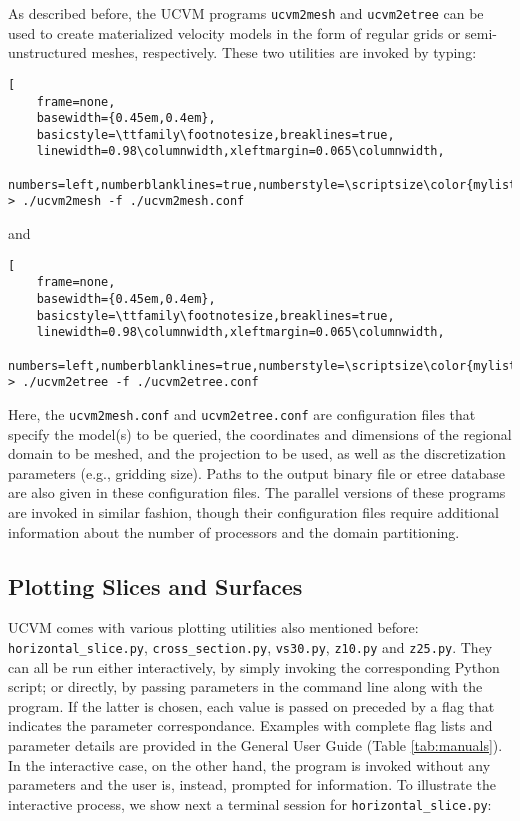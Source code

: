 As described before, the UCVM programs \texttt{ucvm2mesh} and \texttt{ucvm2etree} can be used to create materialized velocity models in the form of regular grids or semi-unstructured meshes, respectively. These two utilities are invoked by typing:

\begin{lstlisting}[
	frame=none,
	basewidth={0.45em,0.4em},
	basicstyle=\ttfamily\footnotesize,breaklines=true,
	linewidth=0.98\columnwidth,xleftmargin=0.065\columnwidth,
	numbers=left,numberblanklines=true,numberstyle=\scriptsize\color{mylistingnclr}]
> ./ucvm2mesh -f ./ucvm2mesh.conf
\end{lstlisting}

\noindent
and

\begin{lstlisting}[
	frame=none,
	basewidth={0.45em,0.4em},
	basicstyle=\ttfamily\footnotesize,breaklines=true,
	linewidth=0.98\columnwidth,xleftmargin=0.065\columnwidth,
	numbers=left,numberblanklines=true,numberstyle=\scriptsize\color{mylistingnclr}]
> ./ucvm2etree -f ./ucvm2etree.conf
\end{lstlisting}

\noindent
Here, the \texttt{ucvm2mesh.conf} and \texttt{ucvm2etree.conf} are configuration files that specify the model(s) to be queried, the coordinates and dimensions of the regional domain to be meshed, and the projection to be used, as well as the discretization parameters (e.g., gridding size). Paths to the output binary file or etree database are also given in these configuration files. The parallel versions of these programs are invoked in similar fashion, though their configuration files require additional information about the number of processors and the domain partitioning.

\subsection{Plotting Slices and Surfaces}

UCVM comes with various plotting utilities also mentioned before: \texttt{horizontal\_slice.py}, \texttt{cross\_section.py}, \texttt{vs30.py}, \texttt{z10.py} and \texttt{z25.py}. They can all be run either interactively, by simply invoking the corresponding Python script; or directly, by passing parameters in the command line along with the program. If the latter is chosen, each value is passed on preceded by a flag that indicates the parameter correspondance. Examples with complete flag lists and parameter details are provided in the General User Guide (Table \ref{tab:manuals}). In the interactive case, on the other hand, the program is invoked without any parameters and the user is, instead, prompted for information. To illustrate the interactive process, we show next a terminal session for \texttt{horizontal\_slice.py}:

